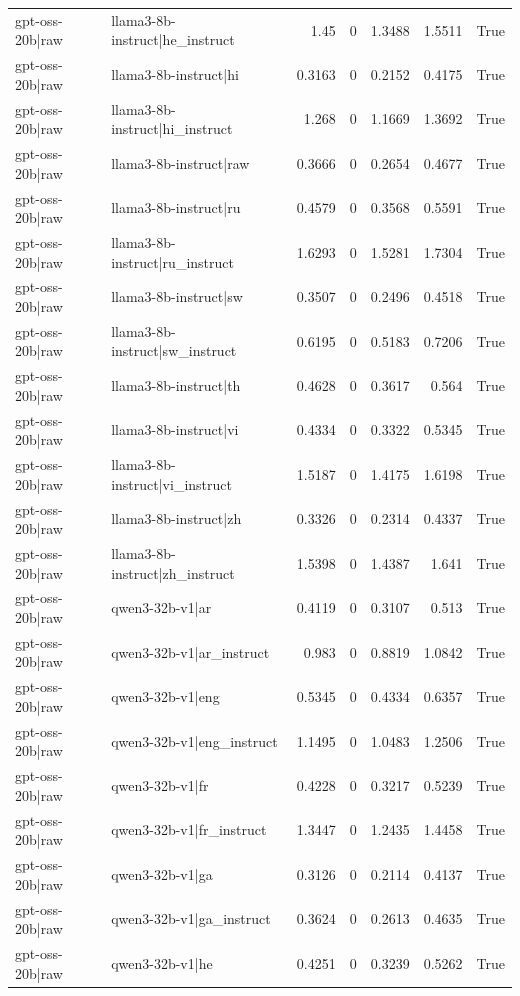 \begin{table}
\begin{tabular}{l l r r r r l}
gpt-oss-20b|raw & llama3-8b-instruct|he_instruct & 1.45 & 0 & 1.3488 & 1.5511 & True \\
gpt-oss-20b|raw & llama3-8b-instruct|hi & 0.3163 & 0 & 0.2152 & 0.4175 & True \\
gpt-oss-20b|raw & llama3-8b-instruct|hi_instruct & 1.268 & 0 & 1.1669 & 1.3692 & True \\
gpt-oss-20b|raw & llama3-8b-instruct|raw & 0.3666 & 0 & 0.2654 & 0.4677 & True \\
gpt-oss-20b|raw & llama3-8b-instruct|ru & 0.4579 & 0 & 0.3568 & 0.5591 & True \\
gpt-oss-20b|raw & llama3-8b-instruct|ru_instruct & 1.6293 & 0 & 1.5281 & 1.7304 & True \\
gpt-oss-20b|raw & llama3-8b-instruct|sw & 0.3507 & 0 & 0.2496 & 0.4518 & True \\
gpt-oss-20b|raw & llama3-8b-instruct|sw_instruct & 0.6195 & 0 & 0.5183 & 0.7206 & True \\
gpt-oss-20b|raw & llama3-8b-instruct|th & 0.4628 & 0 & 0.3617 & 0.564 & True \\
gpt-oss-20b|raw & llama3-8b-instruct|vi & 0.4334 & 0 & 0.3322 & 0.5345 & True \\
gpt-oss-20b|raw & llama3-8b-instruct|vi_instruct & 1.5187 & 0 & 1.4175 & 1.6198 & True \\
gpt-oss-20b|raw & llama3-8b-instruct|zh & 0.3326 & 0 & 0.2314 & 0.4337 & True \\
gpt-oss-20b|raw & llama3-8b-instruct|zh_instruct & 1.5398 & 0 & 1.4387 & 1.641 & True \\
gpt-oss-20b|raw & qwen3-32b-v1|ar & 0.4119 & 0 & 0.3107 & 0.513 & True \\
gpt-oss-20b|raw & qwen3-32b-v1|ar_instruct & 0.983 & 0 & 0.8819 & 1.0842 & True \\
gpt-oss-20b|raw & qwen3-32b-v1|eng & 0.5345 & 0 & 0.4334 & 0.6357 & True \\
gpt-oss-20b|raw & qwen3-32b-v1|eng_instruct & 1.1495 & 0 & 1.0483 & 1.2506 & True \\
gpt-oss-20b|raw & qwen3-32b-v1|fr & 0.4228 & 0 & 0.3217 & 0.5239 & True \\
gpt-oss-20b|raw & qwen3-32b-v1|fr_instruct & 1.3447 & 0 & 1.2435 & 1.4458 & True \\
gpt-oss-20b|raw & qwen3-32b-v1|ga & 0.3126 & 0 & 0.2114 & 0.4137 & True \\
gpt-oss-20b|raw & qwen3-32b-v1|ga_instruct & 0.3624 & 0 & 0.2613 & 0.4635 & True \\
gpt-oss-20b|raw & qwen3-32b-v1|he & 0.4251 & 0 & 0.3239 & 0.5262 & True \\

\end{tabular}
\end{table}
